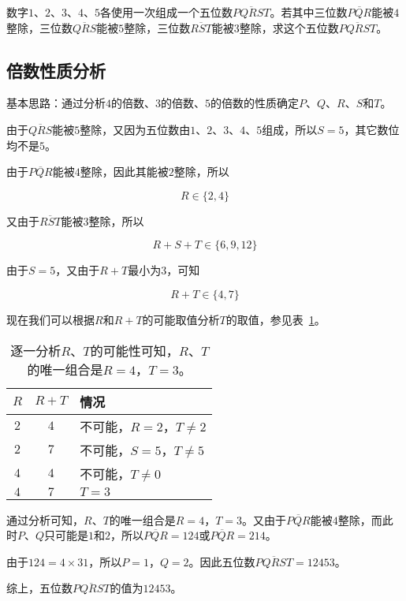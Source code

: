 

数字$1$、$2$、$3$、$4$、$5$各使用一次组成一个五位数$\overline{PQRST}$。若其中三位数$\overline{PQR}$能被$4$整除，三位数$\overline{QRS}$能被$5$整除，三位数$\overline{RST}$能被$3$整除，求这个五位数$\overline{PQRST}$。


\subsection{倍数性质分析}

基本思路：通过分析$4$的倍数、$3$的倍数、$5$的倍数的性质确定$P$、$Q$、$R$、$S$和$T$。

由于$\overline{QRS}$能被$5$整除，又因为五位数由$1$、$2$、$3$、$4$、$5$组成，所以$S = 5$，其它数位均不是$5$。

由于$\overline{PQR}$能被$4$整除，因此其能被$2$整除，所以

\[ R \in \{2, 4\} \]

又由于$\overline{RST}$能被$3$整除，所以

\[ R + S + T \in \{6, 9, 12\} \]

由于$S = 5$，又由于$R + T$最小为$3$，可知

\[ R + T \in \{4, 7\} \]

现在我们可以根据$R$和$R + T$的可能取值分析$T$的取值，参见表~\ref{tab:0035-mul}。

\begin{table}[htbp]
  \centering
  \begin{tabular}{ccl}
    \toprule
    $R$ & $R + T$ & 情况 \\
    \midrule
    $2$ & $4$ & 不可能，$R = 2$，$T \ne2$ \\
    $2$ & $7$ & 不可能，$S = 5$，$T \ne5$ \\
    $4$ & $4$ & 不可能，$T \ne0$ \\
    $4$ & $7$ & $T = 3$ \\
    \bottomrule
  \end{tabular}
  \caption{逐一分析$R$、$T$的可能性可知，$R$、$T$的唯一组合是$R = 4$，$T = 3$。}
  \label{tab:0035-mul}
\end{table}

通过分析可知，$R$、$T$的唯一组合是$R = 4$，$T = 3$。又由于$\overline{PQR}$能被$4$整除，而此时$P$、$Q$只可能是$1$和$2$，所以$\overline{PQR} = 124$或$\overline{PQR} = 214$。

由于$124 = 4\times31$，所以$P = 1$，$Q = 2$。因此五位数$\overline{PQRST} = 12453$。

综上，五位数$\overline{PQRST}$的值为$12453$。
